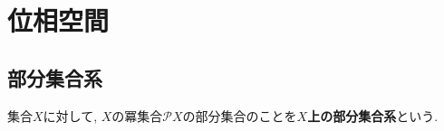 \begin{comment}
************************************
\section{族}
\begin{Def}
集合$I$ 
から集合$X$への写像$f:I\rightarrow X$が存在するとき, 集合$\{x_i\in X\mid x_i=f(i), i\in I\}$のことを
{\bf $I$を添字集合 index set とする$X$の元の族}という.
\end{Def}
************************************
\end{comment}
\section{位相空間}
\subsection{部分集合系}

\begin{Def}
集合$X$に対して, $X$の冪集合$\mathcal{P}X$の部分集合のことを{\bf $X$上の部分集合系}という.
\end{Def}

